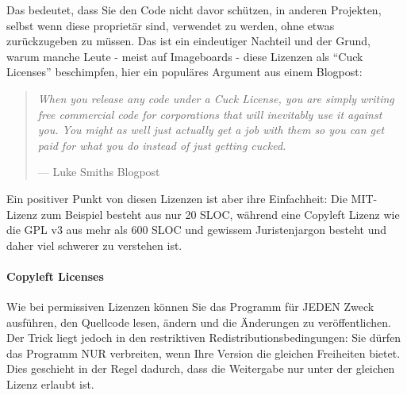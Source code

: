 \documentclass[a4paper,11pt]{article}
\newenvironment{nicequote}[2]{
    \begin{center}\begin{quote}\textit{#1}\\\par\raggedleft--- {#2}
    }{
    \end{quote}\end{center}
}
\begin{document}
Das bedeutet, dass Sie den Code nicht davor schützen, in anderen Projekten, selbst wenn diese proprietär sind, verwendet zu werden, ohne etwas zurückzugeben zu müssen. Das ist ein eindeutiger Nachteil und der Grund, warum manche Leute - meist auf Imageboards \cite{8chan.moe} - diese Lizenzen als ``Cuck Licenses'' beschimpfen, hier ein populäres Argument aus einem Blogpost:
\begin{nicequote}{When you release any code under a Cuck License, you are simply writing free commercial code for corporations that will inevitably use it against you. You might as well just actually get a job with them so you can get paid for what you do instead of just getting cucked.}{Luke Smiths Blogpost \cite{cuckblog}}
\end{nicequote}

Ein positiver Punkt von diesen Lizenzen ist aber ihre Einfachheit: Die MIT-Lizenz zum Beispiel besteht aus nur 20 SLOC, während eine Copyleft Lizenz wie die GPL v3 aus mehr als 600 SLOC und gewissem Juristenjargon besteht und daher viel schwerer zu verstehen ist.\\

\paragraph{Copyleft Licenses}
Wie bei permissiven Lizenzen können Sie das Programm für JEDEN Zweck ausführen, den Quellcode lesen, ändern und die Änderungen zu veröffentlichen. Der Trick liegt jedoch in den restriktiven Redistributionsbedingungen: Sie dürfen das Programm NUR verbreiten, wenn Ihre Version die gleichen Freiheiten bietet. Dies geschieht in der Regel dadurch, dass die Weitergabe nur unter der gleichen Lizenz erlaubt ist.\\
\end{document}
